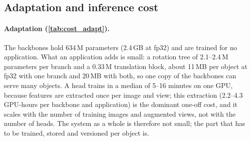 \subsection{Adaptation and inference cost}
\label{sec:cost}

\begin{table}[t]
  \centering\footnotesize
  \setlength{\tabcolsep}{3pt}
  \resizebox{\linewidth}{!}{}
  \par\smallskip
  \resizebox{\linewidth}{!}{}
  \caption{\textbf{What is shared and what is trained.} Top: parameters and fp32 storage of the frozen, shared backbones and of the per-object heads (median checkpoint size; $^*$\,weights only). Bottom: one-off feature extraction per application (GPU-hours over all images and views, from the extraction logs) and median wall-clock training time per head on cached features (one shared GPU; upper bounds). The reported SPEED+ system uses distilled students (median 40\,min per DINOv3 and 84\,min per MoGe-2 head, after a one-off teacher pass) and the jointly trained DINOv3 6-DoF head (25\,min); SPEED+ additionally needs a detector for deployment (6.3\,h training, \cref{sec:spp}).}
  \label{tab:cost_adapt}
\end{table}

\begin{table}[t]
  \centering\footnotesize
  \setlength{\tabcolsep}{4pt}
  
  \caption{\textbf{End-to-end inference cost} (ms per image) of the four configurations on SPEED+ crops, bf16, one shared NVIDIA RTX 6000 Ada, images pre-decoded. Total includes the crop warp(s); DINOv3 and MoGe-2 include feature pooling; the MoGe-2 column includes the CPU consensus-mask step; $^\dagger$\,head: rotation tree(s), orbit candidate generation and scoring. Not included: object detection and, for T-LESS and YCB-V, the roll-homography warp. Peak GPU memory is allocated memory of the whole pipeline.}
  \label{tab:cost_infer}
\end{table}

\paragraph{Adaptation (\cref{tab:cost_adapt}).} The backbones hold 634\,M parameters (2.4\,GB at fp32) and are trained for no application. What an application adds is small: a rotation tree of 2.1--2.4\,M parameters per branch and a 0.33\,M translation block, about 11\,MB per object at fp32 with one branch and 20\,MB with both, so one copy of the backbones can serve many objects. A head trains in a median of 5--16 minutes on one GPU, because features are extracted once per image and view; this extraction (2.2--4.3 GPU-hours per backbone and application) is the dominant one-off cost, and it scales with the number of training images and augmented views, not with the number of heads. The system as a whole is therefore not small; the part that has to be trained, stored and versioned per object is.

